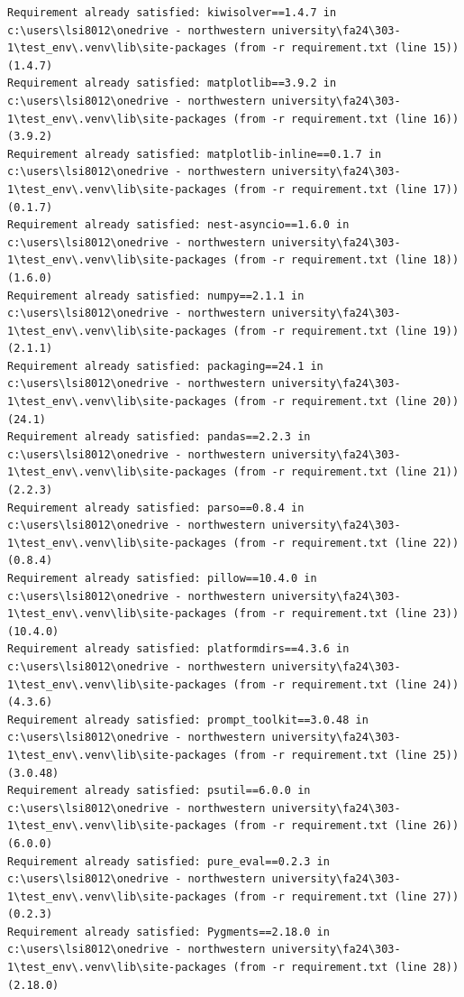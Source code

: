 \documentclass[
  letterpaper,
  DIV=11,
  numbers=noendperiod]{scrreprt}
\begin{document}
\begin{verbatim}
Requirement already satisfied: kiwisolver==1.4.7 in c:\users\lsi8012\onedrive - northwestern university\fa24\303-1\test_env\.venv\lib\site-packages (from -r requirement.txt (line 15)) (1.4.7)
Requirement already satisfied: matplotlib==3.9.2 in c:\users\lsi8012\onedrive - northwestern university\fa24\303-1\test_env\.venv\lib\site-packages (from -r requirement.txt (line 16)) (3.9.2)
Requirement already satisfied: matplotlib-inline==0.1.7 in c:\users\lsi8012\onedrive - northwestern university\fa24\303-1\test_env\.venv\lib\site-packages (from -r requirement.txt (line 17)) (0.1.7)
Requirement already satisfied: nest-asyncio==1.6.0 in c:\users\lsi8012\onedrive - northwestern university\fa24\303-1\test_env\.venv\lib\site-packages (from -r requirement.txt (line 18)) (1.6.0)
Requirement already satisfied: numpy==2.1.1 in c:\users\lsi8012\onedrive - northwestern university\fa24\303-1\test_env\.venv\lib\site-packages (from -r requirement.txt (line 19)) (2.1.1)
Requirement already satisfied: packaging==24.1 in c:\users\lsi8012\onedrive - northwestern university\fa24\303-1\test_env\.venv\lib\site-packages (from -r requirement.txt (line 20)) (24.1)
Requirement already satisfied: pandas==2.2.3 in c:\users\lsi8012\onedrive - northwestern university\fa24\303-1\test_env\.venv\lib\site-packages (from -r requirement.txt (line 21)) (2.2.3)
Requirement already satisfied: parso==0.8.4 in c:\users\lsi8012\onedrive - northwestern university\fa24\303-1\test_env\.venv\lib\site-packages (from -r requirement.txt (line 22)) (0.8.4)
Requirement already satisfied: pillow==10.4.0 in c:\users\lsi8012\onedrive - northwestern university\fa24\303-1\test_env\.venv\lib\site-packages (from -r requirement.txt (line 23)) (10.4.0)
Requirement already satisfied: platformdirs==4.3.6 in c:\users\lsi8012\onedrive - northwestern university\fa24\303-1\test_env\.venv\lib\site-packages (from -r requirement.txt (line 24)) (4.3.6)
Requirement already satisfied: prompt_toolkit==3.0.48 in c:\users\lsi8012\onedrive - northwestern university\fa24\303-1\test_env\.venv\lib\site-packages (from -r requirement.txt (line 25)) (3.0.48)
Requirement already satisfied: psutil==6.0.0 in c:\users\lsi8012\onedrive - northwestern university\fa24\303-1\test_env\.venv\lib\site-packages (from -r requirement.txt (line 26)) (6.0.0)
Requirement already satisfied: pure_eval==0.2.3 in c:\users\lsi8012\onedrive - northwestern university\fa24\303-1\test_env\.venv\lib\site-packages (from -r requirement.txt (line 27)) (0.2.3)
Requirement already satisfied: Pygments==2.18.0 in c:\users\lsi8012\onedrive - northwestern university\fa24\303-1\test_env\.venv\lib\site-packages (from -r requirement.txt (line 28)) (2.18.0)

\end{verbatim}
\end{document}

